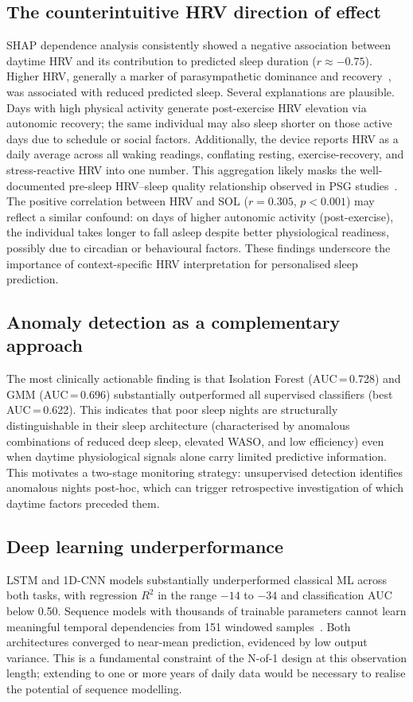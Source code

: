 \documentclass[fleqn,10pt]{wlscirep}
\begin{document}
\subsection*{The counterintuitive HRV direction of effect}
SHAP dependence analysis consistently showed a negative association between daytime HRV and its contribution to predicted sleep duration ($r \approx -0.75$). Higher HRV, generally a marker of parasympathetic dominance and recovery~\cite{herhaus2022}, was associated with reduced predicted sleep. Several explanations are plausible. Days with high physical activity generate post-exercise HRV elevation via autonomic recovery; the same individual may also sleep shorter on those active days due to schedule or social factors. Additionally, the device reports HRV as a daily average across all waking readings, conflating resting, exercise-recovery, and stress-reactive HRV into one number. This aggregation likely masks the well-documented pre-sleep HRV--sleep quality relationship observed in PSG studies~\cite{hayano2022}. The positive correlation between HRV and SOL ($r = 0.305$, $p < 0.001$) may reflect a similar confound: on days of higher autonomic activity (post-exercise), the individual takes longer to fall asleep despite better physiological readiness, possibly due to circadian or behavioural factors. These findings underscore the importance of context-specific HRV interpretation for personalised sleep prediction.

\subsection*{Anomaly detection as a complementary approach}
The most clinically actionable finding is that Isolation Forest (AUC\,=\,0.728) and GMM (AUC\,=\,0.696) substantially outperformed all supervised classifiers (best AUC\,=\,0.622). This indicates that poor sleep nights are structurally distinguishable in their sleep architecture (characterised by anomalous combinations of reduced deep sleep, elevated WASO, and low efficiency) even when daytime physiological signals alone carry limited predictive information. This motivates a two-stage monitoring strategy: unsupervised detection identifies anomalous nights post-hoc, which can trigger retrospective investigation of which daytime factors preceded them.

\subsection*{Deep learning underperformance}
LSTM and 1D-CNN models substantially underperformed classical ML across both tasks, with regression $R^2$ in the range $-14$ to $-34$ and classification AUC below 0.50. Sequence models with thousands of trainable parameters cannot learn meaningful temporal dependencies from 151 windowed samples~\cite{lee2025}. Both architectures converged to near-mean prediction, evidenced by low output variance. This is a fundamental constraint of the N-of-1 design at this observation length; extending to one or more years of daily data would be necessary to realise the potential of sequence modelling.
\end{document}
